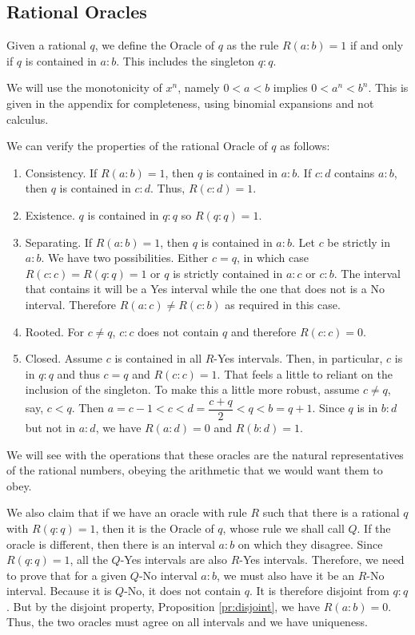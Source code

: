\documentclass[12pt]{article}
\theoremstyle{remark}
\begin{document}
\subsection{Rational Oracles}

Given a rational $q$, we define the Oracle of $q$ as the rule $R(a:b) = 1$ if and only if $q$ is contained in $a:b$. This includes the singleton $q:q$.  

We will use the monotonicity of $x^n$, namely $ 0 < a < b$ implies $0 < a^n < b^n$. This is given in the appendix for completeness, using binomial expansions and not calculus. 

We can verify the properties of the rational Oracle of $q$ as follows: 

\begin{enumerate}
    \item Consistency. If $R(a:b)=1$, then $q$ is contained in $a:b$. If $c:d$ contains $a:b$, then $q$ is contained in $c:d$. Thus, $R(c:d)=1$.
    \item Existence. $q$ is contained in $q:q$ so $R(q:q)=1$.
    \item Separating. If $R(a:b) =1$, then $q$ is contained in $a:b$. Let $c$ be strictly in $a:b$. We have two possibilities. Either $c = q$, in which case $R(c:c)=R(q:q)=1$ or $q$ is strictly contained in $a:c$ or $c:b$. The interval that contains it will be a Yes interval while the one that does not is a No interval. Therefore $R(a:c) \neq R(c:b)$ as required in this case. 
    \item Rooted. For $c \neq q$, $c:c$ does not contain $q$ and therefore $R(c:c)=0$.
    \item Closed. Assume $c$ is contained in all $R$-Yes intervals. Then, in particular, $c$ is in $q:q$ and thus $c=q$ and $R(c:c)=1$. That feels a little to reliant on the inclusion of the singleton. To make this a little more robust, assume $c \neq q$, say, $c < q$. Then  $a=c-1 < c < d=\dfrac{c+q}{2} < q < b=q+1$. Since $q$ is in $b:d$ but not in $a:d$, we have $R(a:d)=0$ and $R(b:d)=1$. 
\end{enumerate}

We will see with the operations that these oracles are the natural representatives of the rational numbers, obeying the arithmetic that we would want them to obey.  

We also claim that if we have an oracle with rule $R$ such that there is a rational $q$ with $R(q:q)=1$, then it is the Oracle of $q$, whose rule we shall call $Q$. If the oracle is different, then there is an interval $a:b$ on which they disagree. Since $R(q:q) =1$, all the  $Q$-Yes intervals are also $R$-Yes intervals. Therefore, we need to prove that for a given  $Q$-No interval $a:b$, we must also have it be an $R$-No interval. Because it is $Q$-No, it does not contain $q$. It is therefore disjoint from $q:q$. But by the disjoint property, Proposition \ref{pr:disjoint}, we have $R(a:b)=0$. Thus, the two oracles must agree on all intervals and we have uniqueness. 
\end{document}

